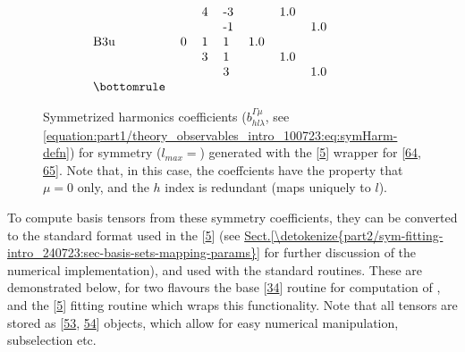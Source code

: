 \documentclass[letterpaper,table,10pt,english]{jupyterBook}
\begin{document}
\begin{figure}[htbp]
\begin{equation*}
\begin{split}
\begin{tabular}{llllllllll}
    &   & 4 & -3 &      &  1.0 &      &      &      &      \\
    &   &   & -1 &      &      &  1.0 &      &      &      \\
B3u & 0 & 1 &  1 &  1.0 &      &      &      &      &      \\
    &   & 3 &  1 &      &  1.0 &      &      &      &      \\
    &   &   &  3 &      &      &  1.0 &      &      &      \\
\bottomrule
\end{tabular}\end{split}
\end{equation*}\caption{Symmetrized harmonics coefficients (\(b_{hl\lambda}^{\Gamma\mu}\), see \eqref{equation:part1/theory_observables_intro_100723:eq:symHarm-defn}) for  symmetry (\(l_{max}=\)) generated with the  {[}\hyperlink{cite.backmatter/bibliography:id681}{5}{]} wrapper for  {[}\hyperlink{cite.backmatter/bibliography:id707}{64}, \hyperlink{cite.backmatter/bibliography:id708}{65}{]}. Note that, in this case, the coeffcients have the property that \(\mu=0\) only, and the \(h\) index is redundant (maps uniquely to \(l\)).}\label{\detokenize{part1/theory_tensor_formalism_160723:tab-d2hxlm}}\end{figure}

\sphinxAtStartPar
To compute basis tensors from these symmetry coefficients, they can be converted to the standard {\hyperref[\detokenize{backmatter/glossary:term-radial-matrix-elements}]{}} format used in the  {[}\hyperlink{cite.backmatter/bibliography:id681}{5}{]} (see \hyperref[\detokenize{part2/sym-fitting-intro_240723:sec-basis-sets-mapping-params}]{Sect.\@ \ref{\detokenize{part2/sym-fitting-intro_240723:sec-basis-sets-mapping-params}}} for further discussion of the numerical implementation), and used with the standard routines. These are demonstrated below, for two flavours \sphinxhyphen{} the base  {[}\hyperlink{cite.backmatter/bibliography:id607}{34}{]} routine for computation of {\hyperref[\detokenize{backmatter/glossary:term-AF}]{}}, and the  {[}\hyperlink{cite.backmatter/bibliography:id681}{5}{]} fitting routine which wraps this functionality. Note that all tensors are stored as  {[}\hyperlink{cite.backmatter/bibliography:id697}{53}, \hyperlink{cite.backmatter/bibliography:id973}{54}{]} objects, which allow for easy numerical manipulation, subselection etc.
\end{document}
